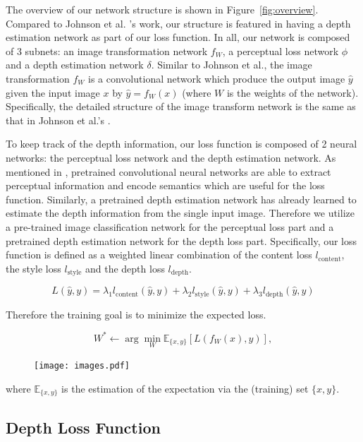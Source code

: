 \documentclass[10pt,twocolumn,letterpaper]{article}
\begin{document}
The overview of our network structure is shown in Figure~\ref{fig:overview}. Compared to Johnson et al. \cite{johnson2016perceptual}'s work, our structure is featured in having a depth estimation network as part of our loss function. In all, our network is composed of 3 subnets: an image transformation network $f_W$, a perceptual loss network $\phi$ and a depth estimation network $\delta$. Similar to Johnson et al., the image transformation $f_W$ is a convolutional network which produce the output image $\hat y$ given the input image $x$ by $\hat y = f_W(x)$ (where $W$ is the weights of the network). Specifically, the detailed structure of the image transform network is the same as that in Johnson et al.'s \cite{johnson2016perceptual}.

To keep track of the depth information, our loss function is composed of 2 neural networks: the perceptual loss network and the depth estimation network. As mentioned in \cite{johnson2016perceptual}, pretrained convolutional neural networks are able to extract perceptual information and encode semantics which are useful for the loss function. Similarly, a pretrained depth estimation network has already learned to estimate the depth information from the single input image. Therefore we utilize a pre-trained image classification network for the perceptual loss part and a pretrained depth estimation network for the depth loss part. Specifically, our loss function is defined as a weighted linear combination of the content loss $l_\text{content}$, the style loss $l_\text{style}$ and the depth loss $l_\text{depth}$. 

\[L(\hat y, y) = \lambda_1 l_\text{content}(\hat y, y) + \lambda_2 l_\text{style}(\hat y, y) + \lambda_3 l_\text{depth}(\hat y, y)\]

Therefore the training goal is to minimize the expected loss.

\[ W^* \gets \arg \min_W \mathbb E_{\{x,y\}}[L(f_W(x), y)], \]

\begin{figure}
\vspace*{-1in}
\hspace*{-0.7in}
\texttt{[image: images.pdf]}
\end{figure}

where $\mathbb E_{\{x,y\}}$ is the estimation of the expectation via the (training) set $\{x,y\}$.

\subsection{Depth Loss Function}
\end{document}
